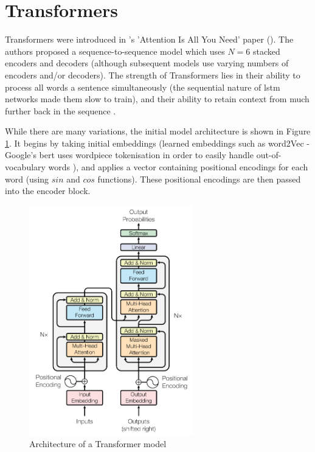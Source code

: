 \section{Transformers}
\label{sec:background_transformers}
Transformers were introduced in \citeauthor{vaswani2017attention}'s 'Attention Is All You Need' paper (\citeyear{vaswani2017attention}). The authors proposed a sequence-to-sequence model which uses $N=6$ stacked encoders and decoders (although subsequent models use varying numbers of encoders and/or decoders). The strength of Transformers lies in their ability to process all words a sentence simultaneously (the sequential nature of \acrshort{lstm} networks made them slow to train), and their ability to retain context from much further back in the sequence \cite{vaswani2017attention}. 

While there are many variations, the initial model architecture is shown in Figure \ref{fig:transformer_architecture}. It begins by taking initial embeddings (learned embeddings such as word2Vec - Google's \acrshort{bert} uses wordpiece tokenisation in order to easily handle out-of-vocabulary words \citep{wu2016googles}), and applies a vector containing positional encodings for each word (using $sin$ and $cos$ functions). These positional encodings are then passed into the encoder block.

\begin{figure}[h]
    \centering
    \includegraphics[height=10cm,trim={0 0 0cm 0cm},clip]{Paper/images/transformer.png}
    \caption{Architecture of a Transformer model \citep{vaswani2017attention}}
    \label{fig:transformer_architecture}
\end{figure}

